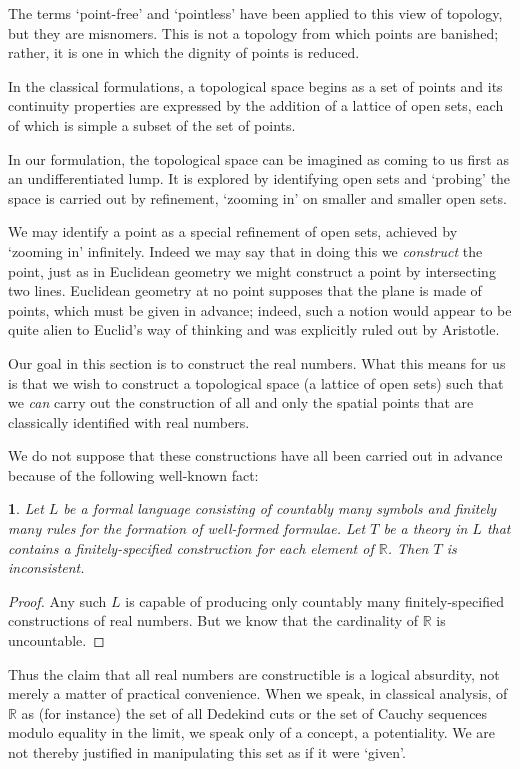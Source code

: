 \documentclass[oneside,english]{amsbook}
\numberwithin{section}{chapter}
\theoremstyle{plain}
\newtheorem{thm}{\protect\theoremname}
\theoremstyle{definition}
\providecommand{\theoremname}{Theorem}
\begin{document}
The terms `point-free' and `pointless' have been applied to this view of topology, but they are misnomers. This is not a topology from which points are banished; rather, it is one in which the dignity of points is reduced. 

In the classical formulations, a topological space begins as a set of points and its continuity properties are expressed by the addition of a lattice of open sets, each of which is simple a subset of the set of points.

In our formulation, the topological space can be imagined as coming to us first as an undifferentiated lump. It is explored by identifying open sets and `probing' the space is carried out by refinement, `zooming in' on smaller and smaller open sets.

We may identify a point as a special refinement of open sets, achieved by `zooming in' infinitely. Indeed we may say that in doing this we \emph{construct} the point, just as in Euclidean geometry we might construct a point by intersecting two lines. Euclidean geometry at no point supposes that the plane is made of points, which must be given in advance; indeed, such a notion would appear to be quite alien to Euclid's way of thinking and was explicitly ruled out by Aristotle.

Our goal in this section is to construct the real numbers. What this means for us is that we wish to construct a topological space (a lattice of open sets) such that we \emph{can} carry out the construction of all and only the spatial points that are classically identified with real numbers. 

We do not suppose that these constructions have all been carried out in advance because of the following well-known fact:
\begin{thm}
	Let $L$ be a formal language consisting of countably many symbols and finitely many rules for the formation of well-formed formulae. Let $T$ be a theory in $L$ that contains a finitely-specified construction for each element of $\mathbb{R}$. Then $T$ is inconsistent.
\end{thm}

\begin{proof}
	Any such $L$ is capable of producing only countably many finitely-specified  constructions of real numbers. But we know that the cardinality of $\mathbb{R}$ is uncountable.
\end{proof}

Thus the claim that all real numbers are constructible is a logical absurdity, not merely a matter of practical convenience. When we speak, in classical analysis, of $\mathbb{R}$ as (for instance) the set of all Dedekind cuts or the set of Cauchy sequences modulo equality in the limit, we speak only of a concept, a potentiality. We are not thereby justified in manipulating this set as if it were `given'.
\end{document}
